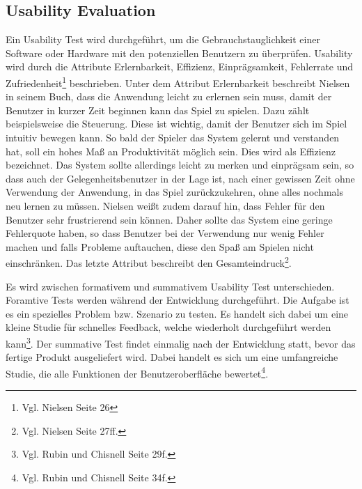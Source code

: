 		
	\subsection{Usability Evaluation}
		Ein Usability Test wird durchgeführt, um die Gebrauchstauglichkeit einer Software oder Hardware mit den potenziellen Benutzern zu überprüfen. Usability wird durch die Attribute Erlernbarkeit, Effizienz, Einprägsamkeit, Fehlerrate und Zufriedenheit\footnote{Vgl. Nielsen \cite{NielsenUI} Seite 26} beschrieben. Unter dem Attribut Erlernbarkeit beschreibt Nielsen in seinem Buch, dass die Anwendung leicht zu erlernen sein muss, damit der Benutzer in kurzer Zeit beginnen kann das Spiel zu spielen. Dazu zählt beispielsweise die Steuerung. Diese ist wichtig, damit der Benutzer sich im Spiel intuitiv bewegen kann. So bald der Spieler das System gelernt und verstanden hat, soll ein hohes Maß an Produktivität möglich sein. Dies wird als Effizienz bezeichnet. Das System sollte allerdings leicht zu merken und einprägsam sein, so dass auch der Gelegenheitsbenutzer in der Lage ist, nach einer gewissen Zeit ohne Verwendung der Anwendung, in das Spiel zurückzukehren, ohne alles nochmals neu lernen zu müssen. Nielsen weißt zudem darauf hin, dass Fehler für den Benutzer sehr frustrierend sein können. Daher sollte das System eine geringe Fehlerquote haben, so dass Benutzer bei der Verwendung nur wenig Fehler machen und falls Probleme auftauchen, diese den Spaß am Spielen nicht einschränken. Das letzte Attribut beschreibt den Gesamteindruck\footnote{Vgl. Nielsen \cite{NielsenUI} Seite 27ff.}.
		
		Es wird zwischen formativem und summativem Usability Test unterschieden. Foramtive Tests werden während der Entwicklung durchgeführt. Die Aufgabe ist es ein spezielles Problem bzw. Szenario zu testen. Es handelt sich dabei um eine kleine Studie für schnelles Feedback, welche wiederholt durchgeführt werden kann\footnote{Vgl. Rubin und Chisnell \cite{handbookUsability} Seite 29f.}. Der summative Test findet einmalig nach der Entwicklung statt, bevor das fertige Produkt ausgeliefert wird. Dabei handelt es sich um eine umfangreiche Studie, die alle Funktionen der Benutzeroberfläche bewertet\footnote{Vgl. Rubin und Chisnell \cite{handbookUsability} Seite 34f.}.
		
